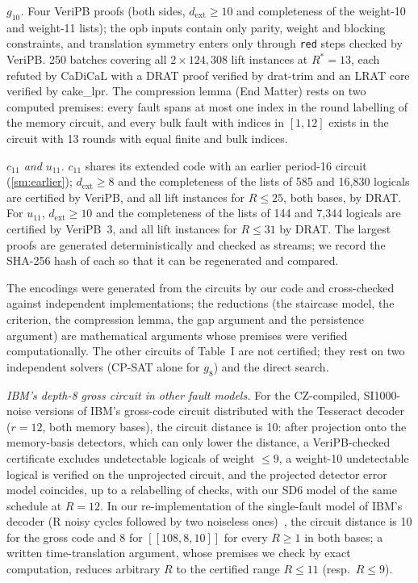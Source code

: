 \documentclass[aps,prl,twocolumn,superscriptaddress,nofootinbib]{revtex4-2}
\newcommand{\dext}{d_{\mathrm{ext}}}
\newcommand{\code}[1]{[[#1]]}
\begin{document}
\emph{$g_{10}$.} Four VeriPB proofs (both sides, $\dext\ge10$ and completeness of the
weight-10 and weight-11 lists); the opb inputs contain only parity, weight and blocking
constraints, and translation symmetry enters only through \texttt{red} steps checked by
VeriPB. 250 batches covering all $2\times124{,}308$ lift instances at $R^*=13$, each refuted
by CaDiCaL with a DRAT proof verified by drat-trim and an LRAT core verified by cake\_lpr.
The compression lemma (End Matter) rests on two computed premises: every fault spans at
most one index in the round labelling of the memory circuit, and every bulk fault with
indices in $[1,12]$ exists in the circuit with 13 rounds with equal finite and bulk indices.

\emph{$c_{11}$ and $u_{11}$.} $c_{11}$ shares its extended code with an earlier period-16
circuit (\ref{sm:earlier}); $\dext\ge8$ and the completeness of the lists of 585 and 16,830
logicals are certified by VeriPB, and all lift instances for $R\le25$, both bases, by DRAT.
For $u_{11}$, $\dext\ge10$ and the completeness of the lists of 144 and 7,344 logicals are
certified by VeriPB~3, and all lift instances for $R\le31$ by DRAT. The largest proofs are
generated deterministically and checked as streams; we record the SHA-256 hash of each so
that it can be regenerated and compared.

The encodings were generated from the circuits by our code and cross-checked against
independent implementations; the reductions (the staircase model, the criterion, the
compression lemma, the gap argument and the persistence argument) are mathematical
arguments whose premises were verified computationally. The other circuits of Table~I are
not certified; they rest on two independent solvers (CP-SAT alone for $g_8$) and the direct search.

\emph{IBM's depth-8 gross circuit in other fault models.} For the CZ-compiled,
SI1000-noise versions of IBM's gross-code circuit distributed with the Tesseract
decoder~\cite{Tesseract2025} ($r=12$, both memory bases), the circuit distance is 10: after
projection onto the memory-basis detectors, which can only lower the distance, a
VeriPB-checked certificate excludes undetectable logicals of weight $\le9$, a weight-10
undetectable logical is verified on the unprojected circuit, and the projected detector error
model coincides, up to a relabelling of checks, with our SD6 model of the same schedule at
$R=12$. In our re-implementation of the single-fault model of IBM's decoder (R noisy cycles
followed by two noiseless ones)~\cite{Bravyi2024,Crocker2026}, the circuit distance is 10 for
the gross code and 8 for $\code{108,8,10}$ for every $R\ge1$ in both bases; a written
time-translation argument, whose premises we check by exact computation, reduces arbitrary
$R$ to the certified range $R\le11$ (resp.\ $R\le9$).
\end{document}
